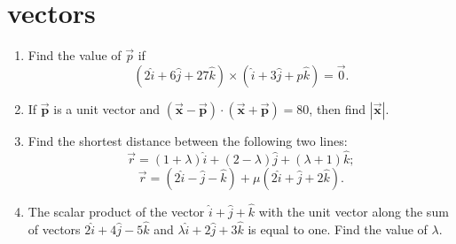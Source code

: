 \documentclass{article}
\begin{document}
\section*{vectors}
\begin{enumerate}
\item 
Find the value of $\vec{p}$ if 
$$(2\hat{i} + 6\hat{j} + 27\hat{k}) \times (\hat{i} + 3\hat{j} + p\hat{k}) = \vec{0}.$$

\item 
If $\mathbf{\vec{p}}$ is a unit vector and $(\mathbf{\vec{x}} - \mathbf{\vec{p}}) \cdot (\mathbf{\vec{x}} + \mathbf{\vec{p}}) = 80$, then find $|\mathbf{\vec{x}}|$.
\item 

Find the shortest distance between the following two lines:
$$\vec{r} = (1 + \lambda)\hat{i} + (2 - \lambda)\hat{j} + (\lambda + 1)\hat{k};$$
$$\vec{r} = (2\hat{i} - \hat{j} - \hat{k}) + \mu(2\hat{i} + \hat{j} + 2\hat{k}).$$

\item 
The scalar product of the vector $\hat{i} + \hat{j} + \hat{k}$ with the unit vector along the sum of vectors $2\hat{i} + 4\hat{j} - 5\hat{k}$ and $\lambda \hat{i} + 2\hat{j} + 3\hat{k}$ is equal to one. Find the value of $\lambda$.
\end{enumerate}
\end{document}
